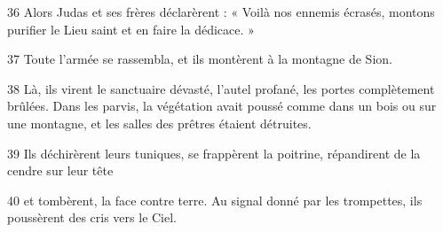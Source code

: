 36 Alors Judas et ses frères déclarèrent : « Voilà nos ennemis écrasés, montons purifier le Lieu saint et en faire la dédicace. »

37 Toute l’armée se rassembla, et ils montèrent à la montagne de Sion.

38 Là, ils virent le sanctuaire dévasté, l’autel profané, les portes complètement brûlées. Dans les parvis, la végétation avait poussé comme dans un bois ou sur une montagne, et les salles des prêtres étaient détruites.

39 Ils déchirèrent leurs tuniques, se frappèrent la poitrine, répandirent de la cendre sur leur tête

40 et tombèrent, la face contre terre. Au signal donné par les trompettes, ils poussèrent des cris vers le Ciel.
